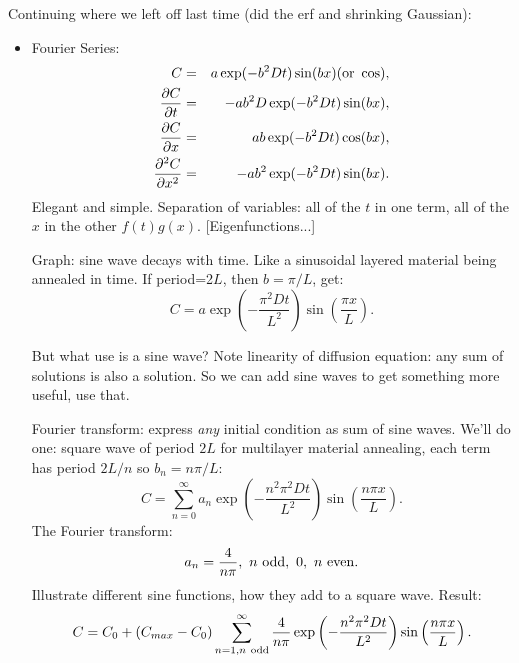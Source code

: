 \documentclass{report}
\begin{document}
\noindent Continuing where we left off last time (did the erf and shrinking
  Gaussian):
\begin{itemize}
\item Fourier Series:
  \begin{eqnarray}
    \label{eq:fourier2}
    C &=& a \exp(-b^2Dt) \sin(bx) ({\rm or }\ \cos), \\
    \frac{\partial C}{\partial t} &=& -ab^2D \exp(-b^2Dt) \sin(bx), \\
    \frac{\partial C}{\partial x} &=& ab \exp(-b^2Dt) \cos(bx), \\
    \frac{\partial^2 C}{\partial x^2} &=& -ab^2 \exp(-b^2Dt) \sin(bx). \\
  \end{eqnarray}
  Elegant and simple.  Separation of variables: all of the $t$ in one term, all
  of the $x$ in the other $f(t)g(x)$.  [Eigenfunctions...]

  Graph: sine wave decays with time.  Like a sinusoidal layered material being
  annealed in time.  If period=2$L$, then $b=\pi/L$, get:
  \begin{equation}
    \label{eq:sinefit}
    C = a\exp\left(-\frac{\pi^2Dt}{L^2}\right)\sin\left(\frac{\pi x}{L}\right).
  \end{equation}

  But what use is a sine wave?  Note linearity of diffusion equation: any sum
  of solutions is also a solution.  So we can add sine waves to get something
  more useful, use that.

  Fourier transform: express {\em any} initial condition as sum of sine waves.
  We'll do one: square wave of period $2L$ for multilayer material annealing,
  each term has period $2L/n$ so $b_n=n\pi/L$:
  \begin{equation}
    \label{eq:squarefourier}
    C = \sum_{n=0}^\infty a_n \exp\left(-\frac{n^2\pi^2Dt}{L^2}\right)
    \sin\left(\frac{n\pi x}{L}\right).
  \end{equation}
  The Fourier transform:
  \begin{equation}
    \label{eq:fft}
    a_n = \frac{4}{n\pi},\ n\ {\rm odd},\ 0,\ n\ {\rm even}.
  \end{equation}
  Illustrate different sine functions, how they add to a square wave.  Result:
  \begin{equation}
    \label{eq:squarefourierfit}
    C = C_0 + (C_{max}-C_0) \sum_{n=1, n\ {\rm odd}}^\infty \frac{4}{n\pi}
    \exp\left(-\frac{n^2\pi^2Dt}{L^2}\right) \sin\left(\frac{n\pi x}{L}\right).
  \end{equation}


\end{itemize}
\end{document}
